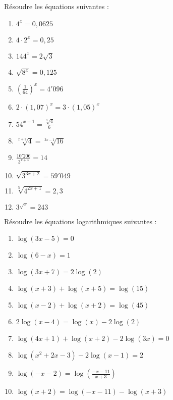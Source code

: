 \begin{exercice}
Résoudre les équations suivantes :
\begin{multicols}{3}
\begin{enumerate} 
\item ${{4}^{x}}=0,0625$
\item $4\cdot {{2}^{x}}=0,25$
\item ${{144}^{x}}=2\sqrt{3}$
\item $\sqrt{{{8}^{x}}}=0,125$
\item ${{\left( \frac{1}{64} \right)}^{x}}=4'096$
\item $2\cdot {{\left( 1,07 \right)}^{x}}=3\cdot {{\left( 1,05 \right)}^{x}}$	
\item ${{54}^{x+1}}=\frac{\sqrt[3]{4}}{6}$
\item $\sqrt[x+1]{4}=\sqrt[3x-1]{16}$
\item $\frac{10'206}{{{3}^{x+3}}}=14$
\item $\sqrt{{{3}^{3x+2}}}=59'049$
\item $\sqrt[5]{{{4}^{2x+1}}}=2,3$
\item ${{3}^{\sqrt{x}}}=243$
\end{enumerate}
\end{multicols}
\end{exercice}

\begin{exercice}
Résoudre les équations logarithmiques suivantes :
\begin{multicols}{2}
\begin{enumerate}
\item $\log \left( 3x-5 \right)=0$
\item $\log \left( 6-x \right)=1$
\item $\log \left( 3x+7 \right)=2\log \left( 2 \right)$
\item $\log \left( x+3 \right)+\log \left( x+5 \right)=\log \left( 15 \right)$
\item $\log \left( x-2 \right)+\log \left( x+2 \right)=\log \left( 45 \right)$
\item $2\log \left( x-4 \right)=\log \left( x \right)-2\log \left( 2 \right)$
\item $\log \left( 4x+1 \right)+\log \left( x+2 \right)-2\log \left( 3x \right)=0$
\item $\log \left( {{x}^{2}}+2x-3 \right)-2\log \left( x-1 \right)=2$
\item $\log \left( -x-2 \right)=\log \left( \frac{-x-11}{x+3} \right)$
\item $\log \left( x+2 \right)=\log \left( -x-11 \right)-\log \left( x+3 \right)$
\end{enumerate}
\end{multicols}
\end{exercice}
